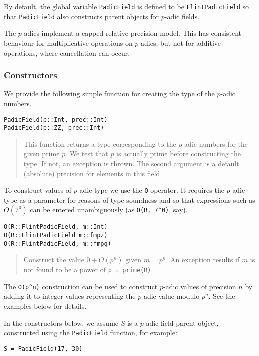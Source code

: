 \documentclass[a4paper,10pt]{article}
\newcommand{\code}{\lstinline}
\newcommand{\desc}[1]{\vspace{-3mm}\begin{quote}#1\end{quote}}
\begin{document}
{{By default, the global variable \code{PadicField} is defined to be
\code{FlintPadicField} so that \code{PadicField} also constructs parent objects
for $p$-adic fields.

The $p$-adics implement a capped relative precision model. This has consistent
behaviour for multiplicative operations on $p$-adics, but not for additive
operations, where cancellation can occur.

\subsubsection{Constructors}

We provide the following simple function for creating the type of the $p$-adic
numbers.

\begin{lstlisting}
PadicField(p::Int, prec::Int)
PadicField(p::ZZ, prec::Int)
\end{lstlisting}

\desc{This function returns a type corresponding to the $p$-adic numbers for
the given prime $p$. We test that $p$ is actually prime before constructing
the type. If not, an exception is thrown. The second argument is a default
(absolute) precision for elements in this field.}

To construct values of $p$-adic type we use the \code{O} operator. It requires
the $p$-adic type as a parameter for reasons of type soundness and so that
expressions such as $O(7^0)$ can be entered unambiguously (as \code{O(R, 7^0)},
say).

\begin{lstlisting}
O(R::FlintPadicField, m::Int)
O(R::FlintPadicField m::fmpz)
O(R::FlintPadicField, m::fmpq)
\end{lstlisting}

\desc{Construct the value $0 + O(p^n)$ given $m = p^n$. An exception results
if $m$ is not found to be a power of \code{p = prime(R)}.}

The \code{O(p^n)} construction can be used to construct $p$-adic values of
precision $n$ by adding it to integer values representing the $p$-adic value
modulo $p^n$. See the examples below for details.

In the constructors below, we assume $S$ is a $p$-adic field parent object,
constructed using the \code{PadicField} function, for example:

\begin{lstlisting}
S = PadicField(17, 30)
\end{lstlisting}

}}
\end{document}
